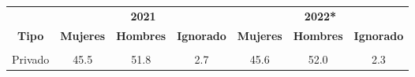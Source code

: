 \begin{tabular}[t]{ccccccc}
\toprule
\multicolumn{1}{c}{\textbf{ }} & \multicolumn{3}{c}{\textbf{2021}} & \multicolumn{3}{c}{\textbf{2022*}} \\
\cmidrule(l{3pt}r{3pt}){2-4} \cmidrule(l{3pt}r{3pt}){5-7}
\textbf{Tipo} & \textbf{Mujeres} & \textbf{Hombres} & \textbf{Ignorado} & \textbf{Mujeres} & \textbf{Hombres} & \textbf{Ignorado}\\
\midrule
\cellcolor[HTML]{B6B3FF}{Público} & \cellcolor[HTML]{B6B3FF}{43.8} & \cellcolor[HTML]{B6B3FF}{56.2} & \cellcolor[HTML]{B6B3FF}{0.0} & \cellcolor[HTML]{B6B3FF}{43.2} & \cellcolor[HTML]{B6B3FF}{56.8} & \cellcolor[HTML]{B6B3FF}{0.0}\\
Privado & 45.5 & 51.8 & 2.7 & 45.6 & 52.0 & 2.3\\
\bottomrule
\end{tabular}
